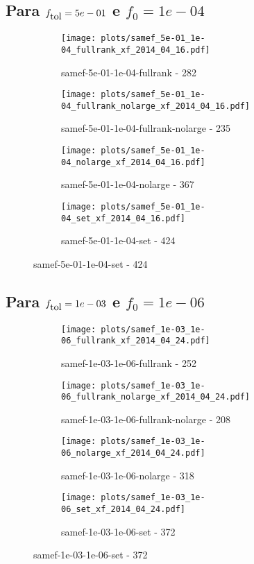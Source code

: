 \newpage
\subsection{Para $f_{\mbox{tol}} = 5e-01$ e $f_0 = 1e-04$}

\begin{figure}[H]
  \centering
  \begin{subfigure}{0.48\textwidth}
    \texttt{[image: plots/samef\_5e-01\_1e-04\_fullrank\_xf\_2014\_04\_16.pdf]}
    \caption{samef-5e-01-1e-04-fullrank - 282}
  \end{subfigure}
  \begin{subfigure}{0.48\textwidth}
    \texttt{[image: plots/samef\_5e-01\_1e-04\_fullrank\_nolarge\_xf\_2014\_04\_16.pdf]}
    \caption{samef-5e-01-1e-04-fullrank-nolarge - 235}
  \end{subfigure}
  \begin{subfigure}{0.48\textwidth}
    \texttt{[image: plots/samef\_5e-01\_1e-04\_nolarge\_xf\_2014\_04\_16.pdf]}
    \caption{samef-5e-01-1e-04-nolarge - 367}
  \end{subfigure}
  \begin{subfigure}{0.48\textwidth}
    \texttt{[image: plots/samef\_5e-01\_1e-04\_set\_xf\_2014\_04\_16.pdf]}
    \caption{samef-5e-01-1e-04-set - 424}
  \end{subfigure}
\end{figure}

\newpage
\subsection{Para $f_{\mbox{tol}} = 1e-03$ e $f_0 = 1e-06$}

\begin{figure}[H]
  \centering
  \begin{subfigure}{0.48\textwidth}
    \texttt{[image: plots/samef\_1e-03\_1e-06\_fullrank\_xf\_2014\_04\_24.pdf]}
    \caption{samef-1e-03-1e-06-fullrank - 252}
  \end{subfigure}
  \begin{subfigure}{0.48\textwidth}
    \texttt{[image: plots/samef\_1e-03\_1e-06\_fullrank\_nolarge\_xf\_2014\_04\_24.pdf]}
    \caption{samef-1e-03-1e-06-fullrank-nolarge - 208}
  \end{subfigure}
  \begin{subfigure}{0.48\textwidth}
    \texttt{[image: plots/samef\_1e-03\_1e-06\_nolarge\_xf\_2014\_04\_24.pdf]}
    \caption{samef-1e-03-1e-06-nolarge - 318}
  \end{subfigure}
  \begin{subfigure}{0.48\textwidth}
    \texttt{[image: plots/samef\_1e-03\_1e-06\_set\_xf\_2014\_04\_24.pdf]}
    \caption{samef-1e-03-1e-06-set - 372}
  \end{subfigure}
\end{figure}

